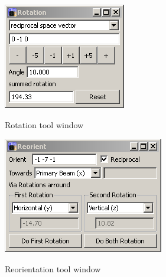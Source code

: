 \begin{figure}[htb]
  \centering
  \begin{minipage}[b]{0.32\textwidth}
    \includegraphics[width=\textwidth]{clip/Tool_Rotation}
    \label{Clip:FigToolRotation}
    \caption{Rotation tool window}
  \end{minipage}
  \imgspace{}
  \begin{minipage}[b]{0.48\textwidth}
    \includegraphics[width=\textwidth]{clip/Tool_Reorient}
    \label{Clip:FigToolReorient}
    \caption{Reorientation tool window}
  \end{minipage}
\end{figure}


